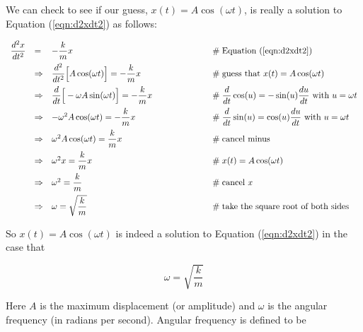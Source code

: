 \documentclass{article}
\theoremstyle{definition}
\begin{document}
\bigskip
\noindent
We can check to see if our guess, $x(t) = A \cos (\omega t)$, is
really a solution to Equation (\ref{eqn:d2xdt2}) as follows:

\begin{equation*}
\begin{array}{llll}
\dfrac{d^2 x}{dt^2}
&=& - \dfrac{k}{m} x            &\qquad \qquad \qquad \mathrel{\#} \text{Equation (\ref{eqn:d2xdt2})} \\
[8pt]
&\Rightarrow& \dfrac{d^2}{dt^2}  \Big [A \cos (\omega t) \Big ] = -\dfrac{k}{m} x
				&\qquad \qquad \qquad \mathrel{\#} \text{guess that $x(t) = A \cos (\omega t)$} \\
[8pt]
&\Rightarrow& \dfrac{d}{dt}  \Big [-\omega A \sin (\omega t) \Big ] = -\dfrac{k}{m} x
				&\qquad \qquad \qquad \mathrel{\#} \text{$\dfrac{d}{dt}\cos (u) 
                                = -\sin (u) \dfrac{du}{dt}$ with $u = \omega t$}  \\
[8pt]
&\Rightarrow& -\omega^2 A \cos (\omega t) = -\dfrac{k}{m} x
				&\qquad \qquad \qquad
                                \mathrel{\#} \text{$\dfrac{d}{dt}\sin (u)
                                = \cos (u) \dfrac{du}{dt}$ with $u = \omega t$}  \\
[8pt]
&\Rightarrow& \omega^2 A \cos (\omega t) = \dfrac{k}{m} x
                                &\qquad \qquad \qquad \mathrel{\#} \text{cancel minus} \\
[8pt]
&\Rightarrow& \omega^2 x = \dfrac{k}{m} x
                                &\qquad \qquad \qquad \mathrel{\#} x(t) = A \cos (\omega t) \\
[8pt]
&\Rightarrow& \omega^2  = \dfrac{k}{m}
                                &\qquad \qquad \qquad \mathrel{\#} \text{cancel $x$} \\
[8pt]
&\Rightarrow& \omega  = \sqrt{\dfrac{k}{m}}
                                &\qquad \qquad \qquad \mathrel{\#} \text{take the square root of both sides}
\end{array}
\end{equation*}

\bigskip
\noindent
So $x(t) = A \cos (\omega t)$ is indeed a solution to Equation
(\ref{eqn:d2xdt2}) in the case that

\bigskip
\begin{equation}
\omega  = \sqrt{\dfrac{k}{m}}	
\label{eqn:omega0}
\end{equation}

\bigskip
\noindent
Here $A$ is the maximum displacement (or amplitude) and $\omega$
is the angular frequency (in radians per second). Angular frequency 
is defined to be
\end{document}

